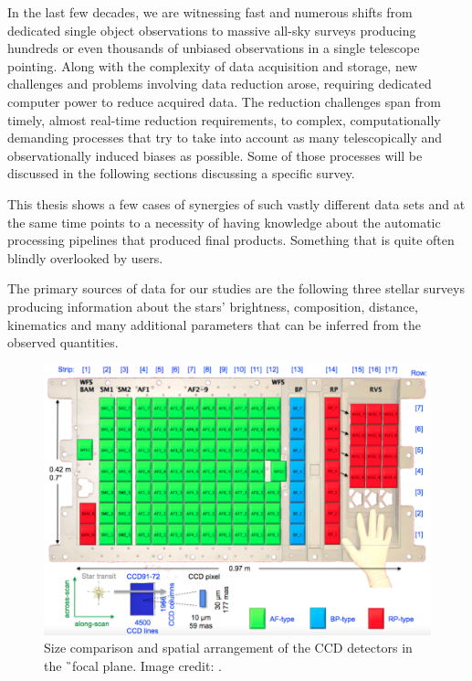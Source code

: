 In the last few decades, we are witnessing fast and numerous shifts from dedicated single object observations to massive all-sky surveys producing hundreds or even thousands of unbiased observations in a single telescope pointing. Along with the complexity of data acquisition and storage, new challenges and problems involving data reduction arose, requiring dedicated computer power to reduce acquired data. The reduction challenges span from timely, almost real-time reduction requirements, to complex, computationally demanding processes that try to take into account as many telescopically and observationally induced biases as possible. Some of those processes will be discussed in the following sections discussing a specific survey.

This thesis shows a few cases of synergies of such vastly different data sets and at the same time points to a necessity of having knowledge about the automatic processing pipelines that produced final products. Something that is quite often blindly overlooked by users.

The primary sources of data for our studies are the following three stellar surveys producing information about the stars' brightness, composition, distance, kinematics and many additional parameters that can be inferred from the observed quantities.

\begin{figure}
	\centering
	\includegraphics[width=\columnwidth]{gaia_ccd.png}
	\caption{Size comparison and spatial arrangement of the CCD detectors in the \G\ focal plane. Image credit: \citet{2016A&A...595A...1G}.}
	\label{fig:gaia_ccd}
\end{figure}

